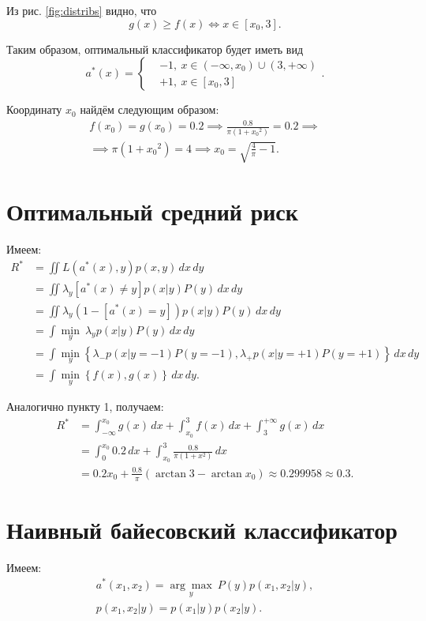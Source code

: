 \documentclass[14pt,a4paper]{article}
\begin{document}
	Из рис. \ref{fig:distribs} видно, что
	\[
		g(x) \geq f(x) \iff x \in [x_0, 3].
	\]
	
	Таким образом, оптимальный классификатор будет иметь вид
	\[
		a^*(x) = 
		\left\{
		\begin{aligned}
			& -1, \ x \in (-\infty, x_0) \cup (3, +\infty) \\
			& +1, \ x \in [x_0, 3]
		\end{aligned}
		\right..
	\]
	
	Координату $x_0$ найдём следующим образом:
	\[
	\begin{gathered}
		f(x_0) = g(x_0) = 0.2 \implies \frac{0.8}{\pi (1 + {x_0}^2)} = 0.2 \implies \\
		\implies \pi (1 + {x_0}^2) = 4 \implies x_0 = \sqrt{\frac{4}{\pi} - 1}.
	\end{gathered}
	\]
	
    \section{Оптимальный средний риск}
    Имеем:
    \[
    	\begin{aligned}
    		R^* &= \iint L(a^*(x), y) p(x, y) \,dx\,dy \\
    		&= \iint \lambda_y [a^*(x) \neq y] p(x | y) P(y) \,dx\,dy \\
    		&= \iint \lambda_y (1 - [a^*(x) = y]) p(x | y) P(y) \,dx\,dy \\
    		&= \int \underset{y}{\min} \ \lambda_y p(x | y) P(y) \,dx\,dy \\
    		&= \int \underset{y}{\min} \left\{ \lambda_{-} p(x | y = -1) P(y = -1), \lambda_{+} p(x | y = +1) P(y = +1) \right\} \,dx\,dy \\
    		&= \int \underset{y}{\min} \left\{ f(x), g(x) \right\} \,dx\,dy.
    	\end{aligned}
    \]
    
    Аналогично пункту 1, получаем:
    \[
    	\begin{aligned}
    		R^* &= \int_{-\infty}^{x_0} g(x) \,dx + \int_{x_0}^{3} f(x) \,dx + \int_{3}^{+\infty} g(x) \,dx \\
    		&= \int_{0}^{x_0} 0.2 \,dx + \int_{x_0}^{3} \frac{0.8}{\pi (1 + x^2)} \,dx \\
    		&= 0.2 x_0 + \frac{0.8}{\pi} (\arctan{3} - \arctan{x_0}) \approx 0.299958 \approx 0.3.
    	\end{aligned}
    \]

    \section{Наивный байесовский классификатор}
    Имеем:
    \[
    	\begin{gathered}
    		a^*(x_1, x_2) = \underset{y}{\arg\!\max} \ P(y) p(x_1, x_2 | y), \\
    		p(x_1, x_2 | y) = p(x_1 | y) p(x_2 | y).
    	\end{gathered}
    \]
    
\end{document}
